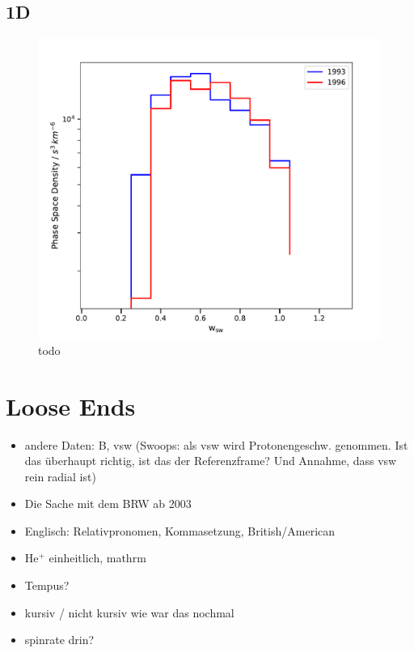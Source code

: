 \subsection{1D}

\begin{figure}[h]
	\includegraphics[width=.8\textwidth]{Figures/1D.pdf}
	\centering
	\caption{todo}
	\label{fig:todo}
\end{figure}

%
%
%
\clearpage
\section{Loose Ends}
\begin{itemize}
	\item andere Daten: B, vsw (Swoops: als vsw wird Protonengeschw. genommen. Ist das überhaupt richtig, ist das der Referenzframe? Und Annahme, dass vsw rein radial ist)
	\item Die Sache mit dem BRW ab 2003
	\item Englisch: Relativpronomen, Kommasetzung, British/American
	\item $\mathrm{He^{+}}$ einheitlich, mathrm
	\item Tempus?
	\item kursiv / nicht kursiv wie war das nochmal
	\item spinrate drin?
\end{itemize}
